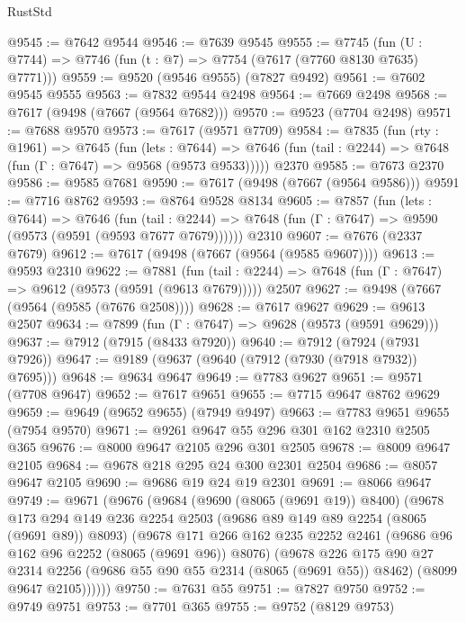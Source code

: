 \begin{lexlean}{RustStd}
\begin{coremodule}
@9545 := @7642 @9544
@9546 := @7639 @9545
@9555 := @7745 (fun (U : @7744) => @7746 (fun (t : @7) => @7754 (@7617 (@7760 @8130 @7635) @7771)))
@9559 := @9520 (@9546 @9555) (@7827 @9492)
@9561 := @7602 @9545 @9555
@9563 := @7832 @9544 @2498
@9564 := @7669 @2498
@9568 := @7617 (@9498 (@7667 (@9564 @7682)))
@9570 := @9523 (@7704 @2498)
@9571 := @7688 @9570
@9573 := @7617 (@9571 @7709)
@9584 := @7835
    (fun (rty : @1961) =>
    @7645
      (fun (lets : @7644) =>
      @7646 (fun (tail : @2244) => @7648 (fun (Γ : @7647) => @9568 (@9573 @9533)))))
    @2370
@9585 := @7673 @2370
@9586 := @9585 @7681
@9590 := @7617 (@9498 (@7667 (@9564 @9586)))
@9591 := @7716 @8762
@9593 := @8764 @9528 @8134
@9605 := @7857
    (fun (lets : @7644) =>
    @7646
      (fun (tail : @2244) => @7648 (fun (Γ : @7647) => @9590 (@9573 (@9591 (@9593 @7677 @7679))))))
    @2310
@9607 := @7676 (@2337 @7679)
@9612 := @7617 (@9498 (@7667 (@9564 (@9585 @9607))))
@9613 := @9593 @2310
@9622 := @7881
    (fun (tail : @2244) => @7648 (fun (Γ : @7647) => @9612 (@9573 (@9591 (@9613 @7679)))))
    @2507
@9627 := @9498 (@7667 (@9564 (@9585 (@7676 @2508))))
@9628 := @7617 @9627
@9629 := @9613 @2507
@9634 := @7899 (fun (Γ : @7647) => @9628 (@9573 (@9591 @9629)))
@9637 := @7912 (@7915 (@8433 @7920))
@9640 := @7912 (@7924 (@7931 @7926))
@9647 := @9189 (@9637 (@9640 (@7912 (@7930 (@7918 @7932)) @7695)))
@9648 := @9634 @9647
@9649 := @7783 @9627
@9651 := @9571 (@7708 @9647)
@9652 := @7617 @9651
@9655 := @7715 @9647 @8762 @9629
@9659 := @9649 (@9652 @9655) (@7949 @9497)
@9663 := @7783 @9651 @9655 (@7954 @9570)
@9671 := @9261 @9647 @55 @296 @301 @162 @2310 @2505 @365
@9676 := @8000 @9647 @2105 @296 @301 @2505
@9678 := @8009 @9647 @2105
@9684 := @9678 @218 @295 @24 @300 @2301 @2504
@9686 := @8057 @9647 @2105
@9690 := @9686 @19 @24 @19 @2301
@9691 := @8066 @9647
@9749 := @9671
    (@9676
      (@9684
        (@9690 (@8065 (@9691 @19)) @8400)
        (@9678
          @173
          @294
          @149
          @236
          @2254
          @2503
          (@9686 @89 @149 @89 @2254 (@8065 (@9691 @89)) @8093)
          (@9678
            @171
            @266
            @162
            @235
            @2252
            @2461
            (@9686 @96 @162 @96 @2252 (@8065 (@9691 @96)) @8076)
            (@9678
              @226
              @175
              @90
              @27
              @2314
              @2256
              (@9686 @55 @90 @55 @2314 (@8065 (@9691 @55)) @8462)
              (@8099 @9647 @2105))))))
@9750 := @7631 @55
@9751 := @7827 @9750
@9752 := @9749 @9751
@9753 := @7701 @365
@9755 := @9752 (@8129 @9753)

\end{coremodule}
\end{lexlean}
